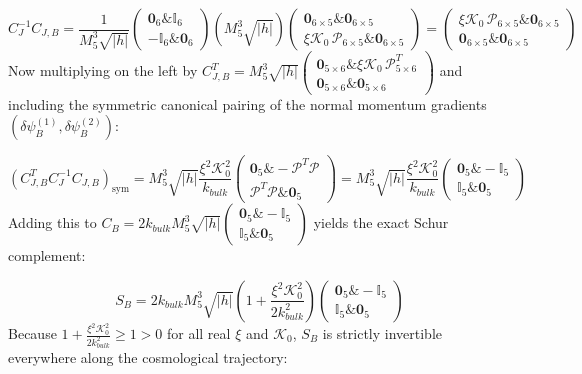 \documentclass[aps,prd,onecolumn,superscriptaddress,nofootinbib,longbibliography,10pt]{revtex4-2}
\begin{document}
{{  \[ C_J^{-1} C_{J,B} = \frac{1}{M_5^3\sqrt{|h|}}\begin{pmatrix} \mathbf{0}_6 \& \mathbb{I}_6 \\ -\mathbb{I}_6 \& \mathbf{0}_6 \end{pmatrix}\left(M_5^3\sqrt{|h|}\right)\begin{pmatrix} \mathbf{0}_{6\times 5} \& \mathbf{0}_{6\times 5} \\ \xi\mathcal{K}_0\,\mathcal{P}_{6\times 5} \& \mathbf{0}_{6\times 5} \end{pmatrix} = \begin{pmatrix} \xi\mathcal{K}_0\,\mathcal{P}_{6\times 5} \& \mathbf{0}_{6\times 5} \\ \mathbf{0}_{6\times 5} \& \mathbf{0}_{6\times 5} \end{pmatrix} \]
  Now multiplying on the left by \(C_{J,B}^T = M_5^3\sqrt{|h|}\begin{pmatrix} \mathbf{0}_{5\times 6} \& \xi\mathcal{K}_0\,\mathcal{P}_{5\times 6}^T \\ \mathbf{0}_{5\times 6} \& \mathbf{0}_{5\times 6} \end{pmatrix}\) and including the symmetric canonical pairing of the normal momentum gradients \((\delta\psi_B^{(1)}, \delta\psi_B^{(2)})\):


  \[ \left(C_{J,B}^T C_J^{-1} C_{J,B}\right)_{\text{sym}} = M_5^3\sqrt{|h|}\frac{\xi^2\mathcal{K}_0^2}{k_{bulk}}\begin{pmatrix} \mathbf{0}_5 \& -\mathcal{P}^T\mathcal{P} \\ \mathcal{P}^T\mathcal{P} \& \mathbf{0}_5 \end{pmatrix} = M_5^3\sqrt{|h|}\frac{\xi^2\mathcal{K}_0^2}{k_{bulk}}\begin{pmatrix} \mathbf{0}_5 \& -\mathbb{I}_5 \\ \mathbb{I}_5 \& \mathbf{0}_5 \end{pmatrix} \]
  Adding this to \(C_B = 2k_{bulk}M_5^3\sqrt{|h|}\begin{pmatrix} \mathbf{0}_5 \& -\mathbb{I}_5 \\ \mathbb{I}_5 \& \mathbf{0}_5 \end{pmatrix}\) yields the exact Schur complement:


  \[ S_B = 2k_{bulk}M_5^3\sqrt{|h|}\left(1 + \frac{\xi^2\mathcal{K}_0^2}{2k_{bulk}^2}\right)\begin{pmatrix} \mathbf{0}_5 \& -\mathbb{I}_5 \\ \mathbb{I}_5 \& \mathbf{0}_5 \end{pmatrix} \]
  Because \(1 + \frac{\xi^2\mathcal{K}_0^2}{2k_{bulk}^2} \ge 1 > 0\) for all real \(\xi\) and \(\mathcal{K}_0\), \(S_B\) is strictly invertible everywhere along the cosmological trajectory:


}}
\end{document}
